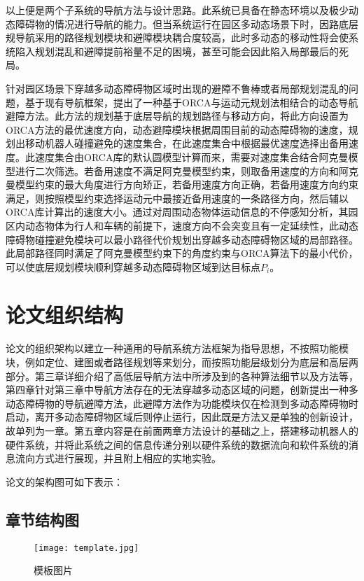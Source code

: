 以上便是两个子系统的导航方法与设计思路。此系统已具备在静态环境以及极少动态障碍物的情况进行导航的能力。但当系统运行在园区多动态场景下时，因路底层规导航采用的路径规划模块和避障模块耦合度较高，此时多动态的移动性将会使系统陷入规划混乱和避障提前裕量不足的困境，甚至可能会因此陷入局部最后的死局。

针对园区场景下穿越多动态障碍物区域时出现的避障不鲁棒或者局部规划混乱的问题，基于现有导航框架，提出了一种基于ORCA与运动元规划法相结合的动态导航避障方法。此方法的规划基于底层导航的规划路径与移动方向，将此方向设置为ORCA方法的最优速度方向，动态避障模块根据周围目前的动态障碍物的速度，规划出移动机器人碰撞避免的速度集合，在此速度集合中根据最优速度选择出备用速度。此速度集合由ORCA库的默认圆模型计算而来，需要对速度集合结合阿克曼模型进行二次筛选。若备用速度不满足阿克曼模型约束，则取备用速度的方向和阿克曼模型约束的最大角度进行方向矫正，若备用速度方向正确，若备用速度方向约束满足，则按照模型约束选择运动元中最接近备用速度的一条路径方向，然后辅以ORCA库计算出的速度大小。通过对周围动态物体运动信息的不停感知分析，其园区内动态物体为行人和车辆的前提下，速度方向不会突变且有一定延续性，此动态障碍物碰撞避免模块可以最小路径代价规划出穿越多动态障碍物区域的局部路径。此局部路径同时满足了阿克曼模型约束下的角度约束与ORCA算法下的最小代价，可以使底层规划模块顺利穿越多动态障碍物区域到达目标点$P_i$。


\section{论文组织结构}
论文的组织架构以建立一种通用的导航系统方法框架为指导思想，不按照功能模块，例如定位、建图或者路径规划等来划分，而按照功能层级划分为底层和高层两部分。第三章详细介绍了高低层导航方法中所涉及到的各种算法细节以及方法等，第四章针对第三章中导航方法存在的无法穿越多动态区域的问题，创新提出一种多动态障碍物的导航避障方法，此避障方法作为功能模块仅在检测到多动态障碍物时启动，离开多动态障碍物区域后则停止运行，因此既是方法又是单独的创新设计，故单列为一章。第五章内容是在前面两章方法设计的基础之上，搭建移动机器人的硬件系统，并将此系统之间的信息传递分别以硬件系统的数据流向和软件系统的消息流向方式进行展现，并且附上相应的实地实验。

论文的架构图可如下表示：

\subsection{章节结构图}
\begin{figure}[ht]
  \centering
  \texttt{[image: template.jpg]}
  \caption{模板图片}
\end{figure}




